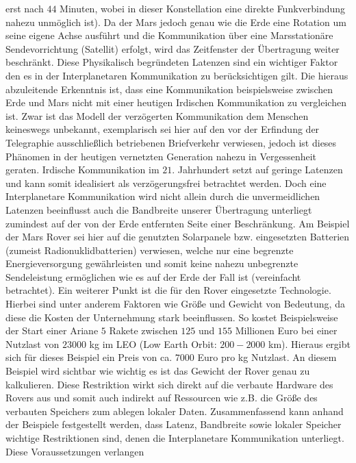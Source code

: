 erst nach $44$ Minuten, wobei in dieser Konstellation eine direkte
Funkverbindung nahezu unm{\"o}glich ist).
Da der Mars jedoch genau wie die Erde eine Rotation um seine eigene Achse ausf{\"u}hrt und die Kommunikation {\"u}ber eine
Marsstation{\"a}re Sendevorrichtung (Satellit) erfolgt, wird das Zeitfenster der
{\"U}bertragung weiter beschr{\"a}nkt. Diese Physikalisch begr{\"u}ndeten
Latenzen sind ein wichtiger Faktor den es in der Interplanetaren Kommunikation
zu ber{\"u}cksichtigen gilt. Die hieraus abzuleitende Erkenntnis ist, dass eine
Kommunikation beispielsweise zwischen Erde und Mars nicht mit einer heutigen
Irdischen Kommunikation zu vergleichen ist. Zwar ist das Modell der
verz{\"o}gerten Kommunikation dem Menschen keineswegs unbekannt, exemplarisch
sei hier auf den vor der Erfindung der Telegraphie ausschlie{\ss}lich
betriebenen Briefverkehr verwiesen, jedoch ist dieses Ph{\"a}nomen in der
heutigen vernetzten Generation nahezu in Vergessenheit geraten. Irdische
Kommunikation im $21$. Jahrhundert setzt auf geringe Latenzen und kann somit
idealisiert als verz{\"o}gerungsfrei betrachtet werden. Doch eine Interplanetare
Kommunikation wird nicht allein durch die unvermeidlichen Latenzen beeinflusst
auch die Bandbreite unserer {\"U}bertragung unterliegt zumindest auf der von der
Erde entfernten Seite einer Beschr{\"a}nkung. Am Beispiel der Mars Rover sei
hier auf die genutzten Solarpanele bzw. eingesetzten Batterien (zumeist
Radionuklidbatterien) verwiesen, welche nur eine begrenzte Energieversorgung
gew{\"a}hrleisten und somit keine nahezu unbegrenzte Sendeleistung 
erm{\"o}glichen wie es auf der Erde der Fall ist (vereinfacht betrachtet). 
Ein weiterer Punkt ist die f{\"u}r den Rover eingesetzte Technologie. Hierbei 
sind unter anderem Faktoren wie Gr{\"o}{\ss}e und Gewicht von Bedeutung, da 
diese die Kosten der Unternehmung stark beeinflussen. So kostet Beispielsweise 
der Start einer Ariane $5$ Rakete zwischen $125$ und $155$ Millionen Euro bei 
einer Nutzlast von $23000$ kg im LEO (Low Earth Orbit: $200-2000$ km). Hieraus 
ergibt sich f{\"u}r dieses Beispiel ein Preis von ca. $7000$ Euro pro kg 
Nutzlast. An diesem Beispiel wird sichtbar wie wichtig es ist das Gewicht 
der Rover genau zu kalkulieren. Diese Restriktion wirkt sich direkt auf die 
verbaute Hardware des Rovers aus und somit auch indirekt auf Ressourcen wie 
z.B. die Gr{\"o}{\ss}e des verbauten Speichers zum ablegen lokaler Daten.
Zusammenfassend kann anhand der Beispiele festgestellt werden, dass Latenz, 
Bandbreite sowie lokaler Speicher wichtige Restriktionen sind, denen die 
Interplanetare Kommunikation unterliegt. Diese Voraussetzungen verlangen 
